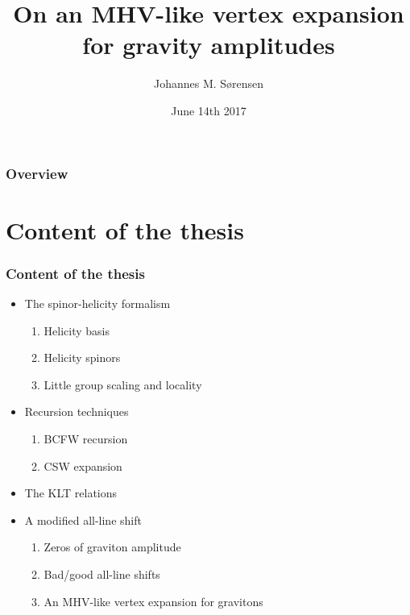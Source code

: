 \documentclass{beamer}[10]
\title{On an MHV-like vertex expansion for gravity amplitudes}
\subtitle{}
\author{Johannes M. Sørensen}
\institute{Niels Bohr Institute \\ University of Copenhagen}
\date{June 14th 2017}
\begin{document}
\frame{\titlepage \vspace{-0.5cm}
}

\frame
{
\frametitle{Overview}
\tableofcontents%
}

\section{Content of the thesis}

\begin{frame}
\frametitle{Content of the thesis}
\begin{block}{}
	\begin{itemize}
		\item The spinor-helicity formalism 
		\begin{enumerate}[-]
			\item{Helicity basis}
			\item{Helicity spinors}
			\item{Little group scaling and locality}
		\end{enumerate}
		\item Recursion techniques
		\begin{enumerate}[-]
			\item BCFW recursion
			\item CSW expansion
		\end{enumerate}
		\item The KLT relations
		\item {}A modified all-line shift
		\begin{enumerate}[-]
			\item Zeros of graviton amplitude
			\item Bad/good all-line shifts
			\item An MHV-like vertex expansion for gravitons
		\end{enumerate}
	\end{itemize}
\pause
{} 
\end{block}	
\end{frame}
\end{document}
